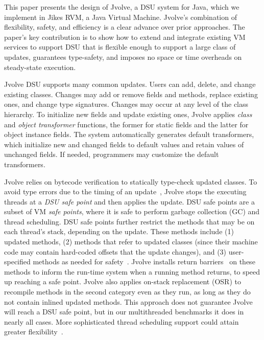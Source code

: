 \documentclass[9pt]{sigplanconf}
\newcommand{\DSU}{{\sc Jvolve}}
\newcommand{\JikesRVM}{Jikes RVM}
\begin{document}
This paper presents the design of \DSU, a DSU system for Java, which
we implement in \JikesRVM, a Java Virtual Machine. \DSU's combination
of flexibility, safety, and efficiency is a clear advance over prior
approaches.  The 
paper's key contribution is to show how to extend and integrate
existing VM services to support DSU that is flexible enough to support
a large class of updates, guarantees type-safety, and imposes no space
or time overheads on steady-state execution.

\DSU{} DSU supports many common updates. Users can add, delete, and
change existing classes.  Changes may add or remove fields and methods,
replace existing ones, and change type signatures.  Changes may occur
at any level of the class hierarchy.  To initialize new fields and
update existing ones, \DSU{} applies \emph{class} and \emph{object
  transformer} functions, the former for static fields and the latter
for object instance fields.  The system automatically generates
default transformers, which initialize new and changed fields to
default values and retain values of unchanged fields.  If needed,
programmers may customize the default transformers.

\DSU{} relies on bytecode verification to statically type-check
updated classes.  To avoid type errors due to the timing of an
update~\cite{StoyleHBSN06,neamtiu06dsu,k42usenix}, \DSU{} stops the executing
threads at a \emph{DSU safe point} and then applies the update. DSU
safe points are a subset of VM \emph{safe points}, where it is safe to perform garbage collection (GC) and thread scheduling.  DSU safe points further
restrict the methods that may be on each thread's stack, depending on
the update.  These methods include (1) updated methods,
(2) methods that refer to updated classes (since their machine code 
may contain hard-coded offsets that the update changes), and (3) user-specified methods
as needed for safety~\cite{Gupta94,neamtiu08context}.  \DSU{} installs return
barriers~\cite{return-barrier} on these methods to inform the run-time system when
a running method returns, to speed up reaching a safe point.  \DSU{}
also applies on-stack replacement (OSR) to recompile methods in the
second category even as they run, as long as they do not contain inlined
updated methods.  This approach does not guarantee \DSU{} will reach a DSU safe point, but in our
multithreaded benchmarks it does in nearly all cases. More sophisticated
thread scheduling support could attain greater
flexibility~\cite{neamtiu09stump}. 
\end{document}
